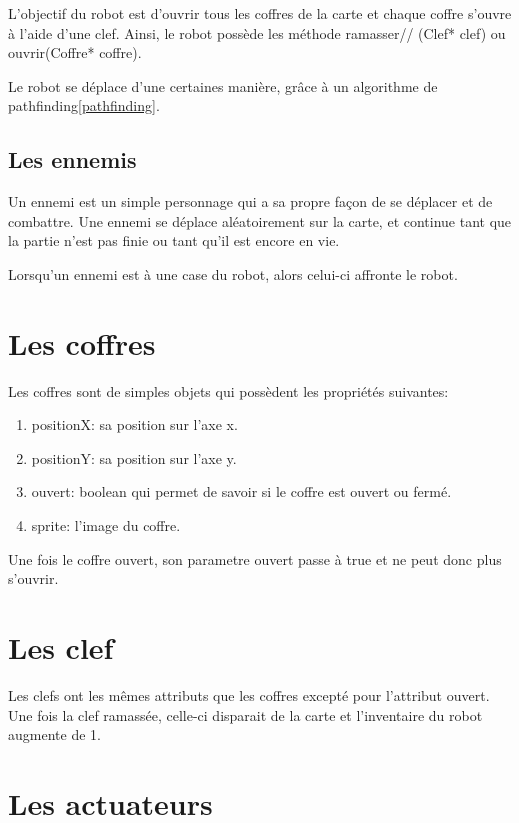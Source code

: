 \documentclass[a4paper 12pts]{article}
\begin{document}
L'objectif du robot est d'ouvrir tous les coffres de la carte et chaque coffre s'ouvre à l'aide d'une clef. Ainsi, le robot possède les méthode ramasser//
(Clef* clef) ou ouvrir(Coffre* coffre).

Le robot se déplace d'une certaines manière, grâce à un algorithme de pathfinding\ref{pathfinding}.

\subsection{Les ennemis}

Un ennemi est un simple personnage qui a sa propre façon de se déplacer et de combattre. 
Une ennemi se déplace aléatoirement sur la carte, et continue tant que la partie n'est pas finie ou tant qu'il est encore en vie.

Lorsqu'un ennemi est à une case du robot, alors celui-ci affronte le robot.


\section{Les coffres}

Les coffres sont de simples objets qui possèdent les propriétés suivantes: 

\begin{enumerate}
	\item positionX: sa position sur l'axe x.
	\item positionY: sa position sur l'axe y. 
	\item ouvert: boolean qui permet de savoir si le coffre est ouvert ou fermé.
	\item sprite: l'image du coffre.
\end{enumerate}

Une fois le coffre ouvert, son parametre ouvert passe à true et ne peut donc plus s'ouvrir.


\section{Les clef}

Les clefs ont les mêmes attributs que les coffres excepté pour l'attribut ouvert. Une fois la clef ramassée, celle-ci disparait de la carte et l'inventaire du robot augmente de 1.

\section{Les actuateurs}
\end{document}
